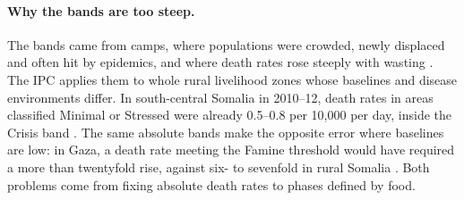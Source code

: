 \documentclass[11pt]{article}
\begin{document}
\paragraph{Why the bands are too steep.} The bands came from camps, where populations were crowded, newly displaced and often hit by epidemics, and where death rates rose steeply with wasting \citep{youngjaspars2009}. The IPC applies them to whole rural livelihood zones whose baselines and disease environments differ. In south-central Somalia in 2010--12, death rates in areas classified Minimal or Stressed were already 0.5--0.8 per 10,000 per day, inside the Crisis band \citep{checchi2013}. The same absolute bands make the opposite error where baselines are low: in Gaza, a death rate meeting the Famine threshold would have required a more than twentyfold rise, against six- to sevenfold in rural Somalia \citep{deZwarte2026Lancet}. Both problems come from fixing absolute death rates to phases defined by food.
\end{document}
